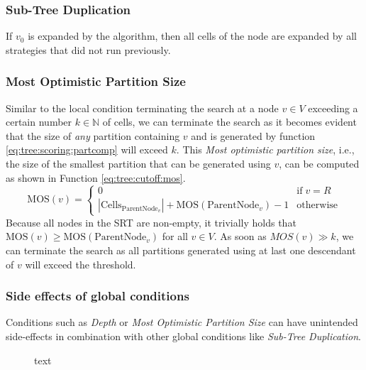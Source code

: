 			\subsubsection{Sub-Tree Duplication}
			
				If $v_0$ is expanded by the algorithm, then all cells of the node are expanded by all strategies that did not run previously.
				
			
			\subsubsection{Most Optimistic Partition Size}
			
				Similar to the local condition terminating the search at a node $v \in V$ exceeding a certain number $k \in \mathbb{N}$ of cells, we can terminate the search as it becomes evident that the size of \textit{any} partition containing $v$ and is generated by function \ref{eq:tree:scoring:partcomp} will exceed $k$.
				This \textit{Most optimistic partition size}, i.e., the size of the smallest partition that can be generated using $v$, can be computed as shown in Function \ref{eq:tree:cutoff:mos}.
				\begin{equation}
				\label{eq:tree:cutoff:mos}
					\mathrm{MOS}(v) = \begin{cases}
						0 & \text{if} \; v = R \\
						|\mathrm{Cells}_{\mathrm{ParentNode}_v}| + \mathrm{MOS}(\mathrm{ParentNode}_v) - 1 & \mathrm{otherwise}
					\end{cases}
				\end{equation}
				Because all nodes in the \ac{SRT} are non-empty, it trivially holds that $\mathrm{MOS}(v) \geq \mathrm{MOS}(\mathrm{ParentNode}_v)$ for all $v \in V$.
				As soon as $MOS(v) \gg k$, we can terminate the search as all partitions generated using at last one descendant of $v$ will exceed the threshold.
				
			\subsubsection{Side effects of global conditions}
				
				Conditions such as \textit{Depth} or \textit{Most Optimistic Partition Size} can have unintended side-effects in combination with other global conditions like \textit{Sub-Tree Duplication}.
				
				
				\begin{figure}[ht!]
					\centering
					
					\caption{text}
					\label{fig:tree:cutoff:mos}
				\end{figure}
		
